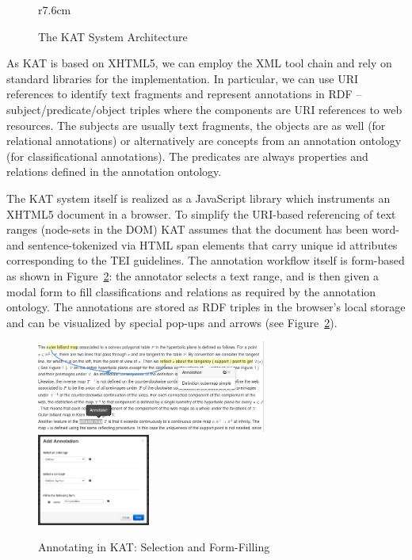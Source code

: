 \documentclass{llncs}
\def\KAT{\textsf{KAT}\xspace}
\begin{document}
\begin{figure}r{7.6cm}\vspace*{-2em}
\def\localxscale{.85}\def\localyscale{1.35}
\caption{The \KAT System Architecture}\label{fig:kat-arch}\vspace*{-1em}
\end{figure}
As \KAT is based on XHTML5, we can employ the XML tool chain and rely on standard libraries
for the implementation. In particular, we can use URI references to identify text
fragments and represent annotations in RDF -- subject/predicate/object triples where the
components are URI references to web resources. The subjects are usually text fragments,
the objects are as well (for relational annotations) or alternatively are concepts from an annotation ontology (for
classificational annotations). The predicates are always properties and relations defined in the annotation ontology.

The \KAT system itself is realized as a JavaScript library which instruments an XHTML5
document in a browser. To simplify the URI-based referencing of text ranges (node-sets in
the DOM) \KAT assumes that the document has been word- and sentence-tokenized via HTML
\textsf{span} elements that carry unique \textsf{id} attributes corresponding to the TEI
guidelines. The annotation workflow itself is form-based as shown in
Figure~\ref{fig:kat-annotate}: the annotator selects a text range, and is then given a
modal form to fill classifications and relations as required by the annotation
ontology. The annotations are stored as RDF triples in the browser's local storage and can
be visualized by special pop-ups and arrows (see Figure~\ref{fig:kat-annotate}).

\begin{figure}[ht]\centering
  \includegraphics[height=3cm]{../PIC/annotate}\quad
  \includegraphics[height=3cm]{../PIC/add-symbol}
  \caption{Annotating in \KAT: Selection and Form-Filling}\label{fig:kat-annotate}
\end{figure}
\end{document}
